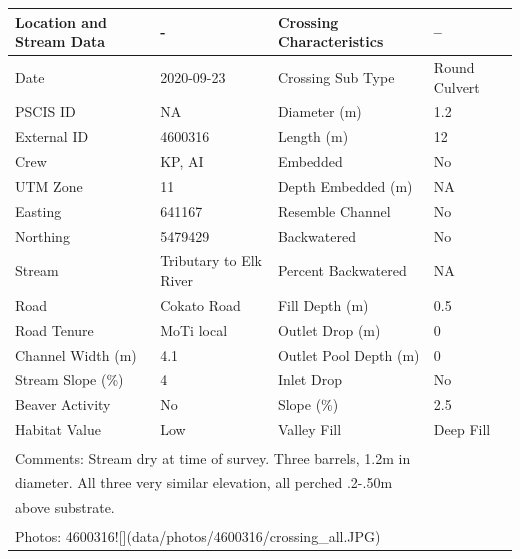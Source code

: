 \documentclass[
]{book}
\begin{document}
\begin{tabular}{l|l|l|l}
\hline
Location and Stream Data & - & Crossing Characteristics & --\\
\hline
Date & 2020-09-23 & Crossing Sub Type & Round Culvert\\
\hline
PSCIS ID & NA & Diameter (m) & 1.2\\
\hline
External ID & 4600316 & Length (m) & 12\\
\hline
Crew & KP, AI & Embedded & No\\
\hline
UTM Zone & 11 & Depth Embedded (m) & NA\\
\hline
Easting & 641167 & Resemble Channel & No\\
\hline
Northing & 5479429 & Backwatered & No\\
\hline
Stream & Tributary to Elk River & Percent Backwatered & NA\\
\hline
Road & Cokato Road & Fill Depth (m) & 0.5\\
\hline
Road Tenure & MoTi local & Outlet Drop (m) & 0\\
\hline
Channel Width (m) & 4.1 & Outlet Pool Depth (m) & 0\\
\hline
Stream Slope (\%) & 4 & Inlet Drop & No\\
\hline
Beaver Activity & No & Slope (\%) & 2.5\\
\hline
Habitat Value & Low & Valley Fill & Deep Fill\\
\hline
\multicolumn{4}{l}{\textsuperscript{} Comments: Stream dry at time of survey. Three barrels, 1.2m in}\\
\multicolumn{4}{l}{diameter. All three very similar elevation, all perched .2-.50m}\\
\multicolumn{4}{l}{above substrate.}\\
\multicolumn{4}{l}{\textsuperscript{} Photos: 4600316![](data/photos/4600316/crossing\_all.JPG)}\\
\end{tabular}
\end{document}
